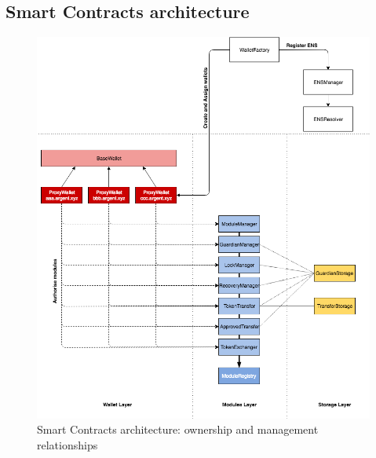 \documentclass[12pt]{article}
\begin{document}
\subsection{Smart Contracts architecture}

\begin{figure}[h]
    \label{fig:sc-arch-1}
    \includegraphics[width=\textwidth]{smart_contract_architecture_1}
    \caption{Smart Contracts architecture: ownership and management relationships}
\end{figure}

\end{document}

